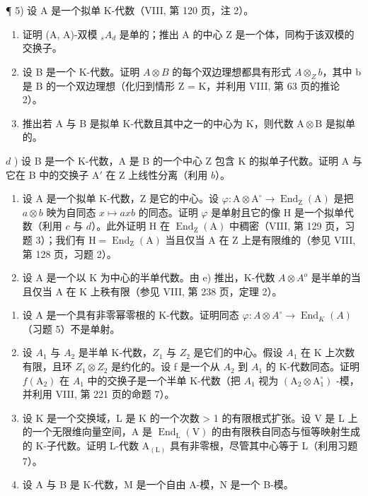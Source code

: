 ¶ 5) 设 A 是一个拟单 K-代数（VIII, 第 120 页，注 2）。

\begin{enumerate}
\def\labelenumi{\alph{enumi})}
\item
  证明 (A, A)-双模 \(_{s}A_{d}\) 是单的；推出 A 的中心 Z 是一个体，同构于该双模的交换子。
\item
  设 B 是一个 K-代数。证明 \(A \otimes B\) 的每个双边理想都具有形式 \(A \otimes_{Z} b\)，其中 b 是 B 的一个双边理想（化归到情形 Z = K，并利用 VIII, 第 63 页的推论 2）。
\item
  推出若 A 与 B 是拟单 K-代数且其中之一的中心为 K，则代数 \(\mathrm{A} \otimes \mathrm{B}\) 是拟单的。
\end{enumerate}

\(d\) ) 设 B 是一个 K-代数，A 是 B 的一个中心 Z 包含 K 的拟单子代数。证明 A 与它在 B 中的交换子 \(\mathrm{A}'\) 在 Z 上线性分离（利用 \(b\)）。

\begin{enumerate}
\def\labelenumi{\alph{enumi})}
\setcounter{enumi}{4}
\item
  设 A 是一个拟单 K-代数，Z 是它的中心。设 \(\varphi : \mathrm{A} \otimes \mathrm{A}^{\circ} \to \operatorname{End}_{\mathrm{Z}}(\mathrm{A})\) 是把 \(a \otimes b\) 映为自同态 \(x \mapsto axb\) 的同态。证明 \(\varphi\) 是单射且它的像 H 是一个拟单代数（利用 \(c\) 与 \(d\)）。此外证明 H 在 \(\operatorname{End}_{\mathrm{Z}}(\mathrm{A})\) 中稠密（VIII, 第 129 页，习题 3）；我们有 \(\mathrm{H} = \operatorname{End}_{\mathrm{Z}}(\mathrm{A})\) 当且仅当 A 在 Z 上是有限维的（参见 VIII, 第 128 页，习题 2）。
\item
  设 A 是一个以 K 为中心的半单代数。由 e) 推出，K-代数 \(A \otimes A^{o}\) 是半单的当且仅当 A 在 K 上秩有限（参见 VIII, 第 238 页，定理 2）。
\end{enumerate}

\begin{enumerate}
\def\labelenumi{\arabic{enumi})}
\setcounter{enumi}{5}
\item
  设 A 是一个具有非零幂零根的 K-代数。证明同态 \(\varphi: A \otimes A^{\circ} \to \operatorname{End}_{K}(A)\)（习题 5）不是单射。
\item
  设 \(A_{1}\) 与 \(A_{2}\) 是半单 K-代数，\(Z_{1}\) 与 \(Z_{2}\) 是它们的中心。假设 \(A_{1}\) 在 K 上次数有限，且环 \(Z_{1} \otimes Z_{2}\) 是约化的。设 f 是一个从 \(A_{2}\) 到 \(A_{1}\) 的 K-代数同态。证明 \(f(\mathrm{A}_{2})\) 在 \(A_{1}\) 中的交换子是一个半单 K-代数（把 \(A_{1}\) 视为 \((\mathrm{A}_{2} \otimes \mathrm{A}_{1}^{\circ})\) -模，并利用 VIII, 第 221 页的命题 7）。
\item
  设 K 是一个交换域，L 是 K 的一个次数 \textgreater{} 1 的有限根式扩张。设 V 是 L 上的一个无限维向量空间，A 是 \(\operatorname{End}_{\mathrm{L}}(\mathrm{V})\) 的由有限秩自同态与恒等映射生成的 K-子代数。证明 L-代数 \(\mathrm{A}_{(\mathrm{L})}\) 具有非零根，尽管其中心等于 L（利用习题 7）。
\item
  设 A 与 B 是 K-代数，M 是一个自由 A-模，N 是一个 B-模。
\end{enumerate}

